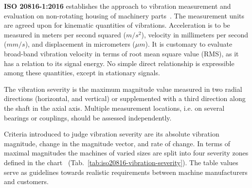\textbf{ISO 20816-1:2016} establishes the approach to vibration measurement and evaluation on non-rotating housing of machinery parts~\cite{noauthor_iso_2016}. The measurement units are agreed upon for kinematic quantities of vibrations. Acceleration is to be measured in meters per second squared ($m/s^2$), velocity in millimeters per second ($mm/s$), and displacement in micrometers ($\mu m$). It is customary to evaluate broad-band vibration velocity in terms of root mean square value (RMS), as it has a relation to its signal energy. No simple direct relationship is expressible among these quantities, except in stationary signals.

The vibration severity is the maximum magnitude value measured in two radial directions (horizontal, and vertical) or supplemented with a third direction along the shaft in the axial axis. Multiple measurement locations, i.e. on several bearings or couplings, should be assessed independently.

Criteria introduced to judge vibration severity are its absolute vibration magnitude, change in the magnitude vector, and rate of change. In terms of maximal magnitudes the machines of varied sizes are split into four severity zones defined in the chart ~(Tab.~\ref{tab:iso20816-vibration-severity}). The table values serve as guidelines towards realistic requirements between machine manufacturers and customers.

